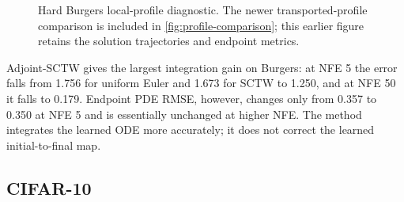 \begin{figure}[t]
  \centering
  \caption{Hard Burgers local-profile diagnostic. The newer transported-profile comparison is
  included in \cref{fig:profile-comparison}; this earlier figure retains the solution trajectories
  and endpoint metrics.}
  \label{fig:burgers-diagnostic}
\end{figure}

\begin{table}[t]
  \centering
  \caption{Hard Burgers integration error to Heun-1000 for the learned ODE; lower is better.}
  \label{tab:burgers-integration}
  
\end{table}

Adjoint-SCTW gives the largest integration gain on Burgers: at NFE 5 the error falls from 1.756
for uniform Euler and 1.673 for SCTW to 1.250, and at NFE 50 it falls to 0.179. Endpoint PDE RMSE,
however, changes only from 0.357 to 0.350 at NFE 5 and is essentially unchanged at higher NFE.
The method integrates the learned ODE more accurately; it does not correct the learned
initial-to-final map.

\subsection{CIFAR-10}
\label{sec:cifar-results}

\begin{table}[t]
  \centering
  \caption{Conditional CIFAR-10 minibatch-OT checkpoint, EMA evaluation with 5000 fixed-prior
  samples. FID is lower better. Results are descriptive for one checkpoint and evaluation seed.}
  \label{tab:cifar-conditional}
  \resizebox{\linewidth}{!}{%
  }
\end{table}

\begin{table}[t]
  \centering
  \caption{Unconditional CIFAR-10 Sinkhorn checkpoint under the same 5000-sample protocol.
  FID is lower better; best fixed has the same post-hoc definition as in \cref{tab:staged}.}
  \label{tab:cifar-unconditional}
  \resizebox{\linewidth}{!}{%
  }
\end{table}

